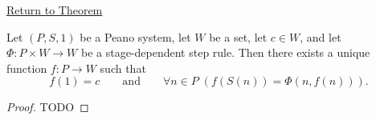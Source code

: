 \newpage
{}
\label{prf:general-recursion-theorem-for-peano-system}

\begin{remark*}[Return]
\hyperref[thm:general-recursion-theorem-for-peano-system]{Return to Theorem}
\end{remark*}

\begin{theorem*}
Let $(P,S,1)$ be a Peano system, let $W$ be a set, let $c\in W$, and let
$\Phi:P\times W\to W$ be a stage-dependent step rule. Then there exists a
unique function $f:P\to W$ such that
\[
f(1)=c
\qquad\text{and}\qquad
\forall n\in P\;(f(S(n))=\Phi(n,f(n))).
\]
\end{theorem*}

\begin{proof}
TODO
\end{proof}
